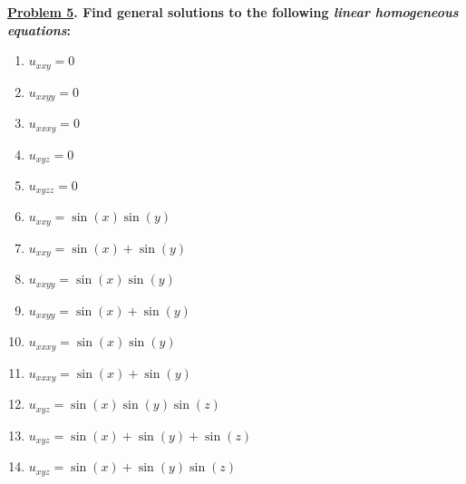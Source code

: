 \documentclass{article}
\theoremstyle{definition}
\newenvironment{boldenv}{\bfseries\boldmath}{}
\begin{document}
	\begin{boldenv}
		\underline{Problem 5}. Find general solutions to the following \textit{linear homogeneous equations}:
		\begin{enumerate}[resume*=problems]
			\item $u_{xxy} = 0$
			\item $u_{xxyy} = 0$
			\item $u_{xxxy} = 0$
			\item $u_{xyz} = 0$
			\item $u_{xyzz} = 0$
			\item $u_{xxy} = \sin(x)\sin(y)$
			\item $u_{xxy} = \sin(x) + \sin(y)$
			\item $u_{xxyy} = \sin(x)\sin(y)$
			\item $u_{xxyy} = \sin(x) + \sin(y)$
			\item $u_{xxxy} = \sin(x)\sin(y)$
			\item $u_{xxxy} = \sin(x) + \sin(y)$
			\item $u_{xyz} = \sin(x)\sin(y)\sin(z)$
			\item $u_{xyz} = \sin(x) + \sin(y) + \sin(z)$
			\item $u_{xyz} = \sin(x) + \sin(y)\sin(z)$
		\end{enumerate}
	\end{boldenv}
	
\end{document}
